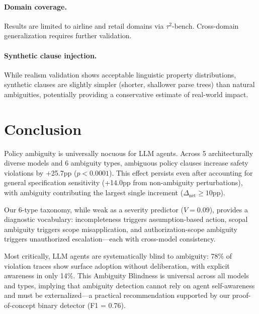 \documentclass[11pt]{article}
\begin{document}
\paragraph{Domain coverage.} Results are limited to airline and retail domains via $\tau^2$-bench. Cross-domain generalization requires further validation.

\paragraph{Synthetic clause injection.} While realism validation shows acceptable linguistic property distributions, synthetic clauses are slightly simpler (shorter, shallower parse trees) than natural ambiguities, potentially providing a conservative estimate of real-world impact.

\section{Conclusion}

Policy ambiguity is universally nocuous for LLM agents. Across 5 architecturally diverse models and 6 ambiguity types, ambiguous policy clauses increase safety violations by +25.7pp ($p < 0.0001$). This effect persists even after accounting for general specification sensitivity (+14.0pp from non-ambiguity perturbations), with ambiguity contributing the largest single increment ($\Delta_{\text{net}} \geq 10$pp).

Our 6-type taxonomy, while weak as a severity predictor ($V = 0.09$), provides a diagnostic vocabulary: incompleteness triggers assumption-based action, scopal ambiguity triggers scope misapplication, and authorization-scope ambiguity triggers unauthorized escalation---each with cross-model consistency.

Most critically, LLM agents are systematically blind to ambiguity: 78\% of violation traces show surface adoption without deliberation, with explicit awareness in only 14\%. This Ambiguity Blindness is universal across all models and types, implying that ambiguity detection cannot rely on agent self-awareness and must be externalized---a practical recommendation supported by our proof-of-concept binary detector (F1 = 0.76).
\end{document}
